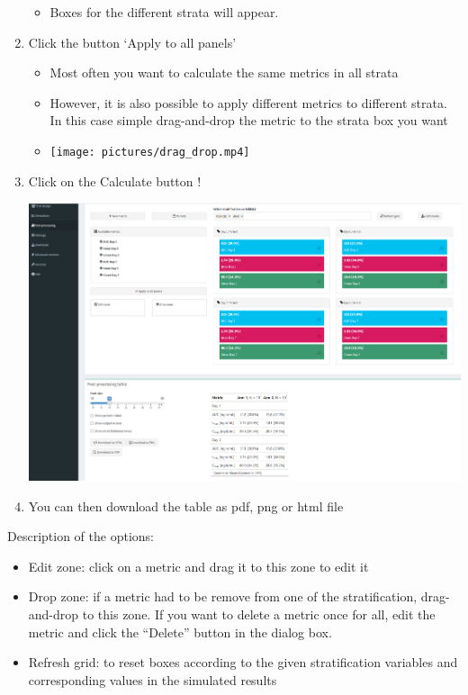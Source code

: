\documentclass[
]{book}
\providecommand{\tightlist}{%
  \setlength{\itemsep}{0pt}\setlength{\parskip}{0pt}}
\begin{document}
\begin{enumerate}
  \begin{itemize}
  \tightlist
  \item
    Boxes for the different strata will appear.
  \end{itemize}
\item
  Click the button `Apply to all panels'

  \begin{itemize}
  \tightlist
  \item
    Most often you want to calculate the same metrics in all strata
  \item
    However, it is also possible to apply different metrics to different strata. In this case simple drag-and-drop the metric to the strata box you want
  \item
    \texttt{[image: pictures/drag\_drop.mp4]}
  \end{itemize}
\item
  Click on the Calculate button !

  \includegraphics[width=5.14583in,height=\textheight]{pictures/htmltable2.png}
\item
  You can then download the table as pdf, png or html file
\end{enumerate}

Description of the options:

\begin{itemize}
\tightlist
\item
  Edit zone: click on a metric and drag it to this zone to edit it
\item
  Drop zone: if a metric had to be remove from one of the stratification, drag-and-drop to this zone. If you want to delete a metric once for all, edit the metric and click the ``Delete'' button in the dialog box.
\item
  Refresh grid: to reset boxes according to the given stratification variables and corresponding values in the simulated results
\end{itemize}
\end{document}
